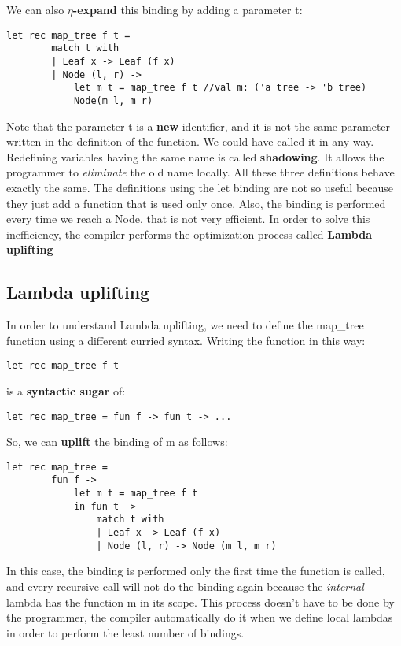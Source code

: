 We can also \textbf{$\eta$-expand} this binding by adding a parameter t:
\begin{lstlisting}[style = FSharpStyle]
    let rec map_tree f t = 
        match t with
        | Leaf x -> Leaf (f x)
        | Node (l, r) ->
            let m t = map_tree f t //val m: ('a tree -> 'b tree)
            Node(m l, m r)
\end{lstlisting}
Note that the parameter t is a \textbf{new} identifier, and it is not the same parameter written in the definition of the function. We could have called it in any way. Redefining variables having the same name is called \textbf{shadowing}. It allows the programmer to \textit{eliminate} the old name locally.\newline\newline
All these three definitions behave exactly the same. The definitions using the let binding are not so useful because they just add a function that is used only once. Also, the binding is performed every time we reach a Node, that is not very efficient. In order to solve this inefficiency, the compiler performs the optimization process called \textbf{Lambda uplifting} 
\subsection{Lambda uplifting}
In order to understand Lambda uplifting, we need to define the map\_tree function using a different curried syntax.\newline\newline
Writing the function in this way:
\begin{lstlisting}[style = FSharpStyle]
    let rec map_tree f t
\end{lstlisting}
is a \textbf{syntactic sugar} of:
\begin{lstlisting}[style = FSharpStyle]
    let rec map_tree = fun f -> fun t -> ...
\end{lstlisting}
So, we can \textbf{uplift} the binding of m as follows:
\begin{lstlisting}[style = FSharpStyle]
    let rec map_tree =
        fun f ->
            let m t = map_tree f t
            in fun t ->
                match t with
                | Leaf x -> Leaf (f x)
                | Node (l, r) -> Node (m l, m r)
\end{lstlisting}
In this case, the binding is performed only the first time the function is called, and every recursive call will not do the binding again because the \textit{internal} lambda has the function m in its scope.\newline\newline
This process doesn't have to be done by the programmer, the compiler automatically do it when we define local lambdas in order to perform the least number of bindings.

